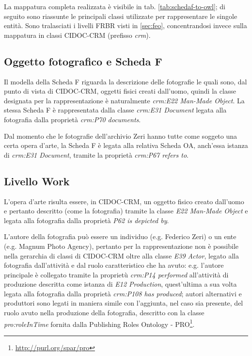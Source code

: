 La mappatura completa realizzata è visibile in tab. \ref{tab:schedaf-to-owl}; di seguito sono riassunte le principali classi utilizzate per rappresentare le singole entità. Sono tralasciati i livelli FRBR visti in \ref{sec:feo}, concentrandosi invece sulla mappatura in classi CIDOC-CRM (prefisso \emph{crm}).

\subsection{Oggetto fotografico e Scheda F}
Il modella della Scheda F riguarda la descrizione delle fotografie le quali sono, dal punto di vista di CIDOC-CRM, oggetti fisici creati dall'uomo, quindi la classe designata per la rappresentazione è naturalmente \emph{crm:E22 Man-Made Object}. La stessa Scheda F è rappresentata dalla classe \emph{crm:E31 Document} legata alla fotografia dalla proprietà \emph{crm:P70 documents}.

Dal momento che le fotografie dell'archivio Zeri hanno tutte come soggeto una certa opera d'arte, la Scheda F è legata alla relativa Scheda OA, anch'essa istanza di \emph{crm:E31 Document}, tramite la proprietà \emph{crm:P67 refers to}.

\subsection{Livello Work}

L'opera d'arte risulta essere, in CIDOC-CRM, un oggetto fisico creato dall'uomo e pertanto descritto (come la fotografia) tramite la classe \emph{E22 Man-Made Object} e legata alla fotografia dalla proprietà \emph{P62 is depicted by}.

L'autore della fotografia può essere un individuo (e.g. Federico Zeri) o un ente (e.g. Magnum Photo Agency), pertanto per la rappresentazione non è possibile nella gerarchia di classi di CIDOC-CRM oltre alla classe \emph{E39 Actor}, legato alla fotografia dall'attività e dal ruolo caratteristico che ha avuto: e.g. l'autore principale è collegato tramite la proprietù \emph{crm:P14 performed} all'attività di produzione descritta come istanza di \emph{E12 Production}, quest'ultima a sua volta legata alla fotografia dalla proprietà \emph{crm:P108 has produced}; autori alternativi e produttori sono legati in maniera simile con l'aggiunta, nel caso sia presente, del ruolo avuto nella produzione della fotografia, descritto con la classe \emph{pro:roleInTime} fornita dalla Publishing Roles Ontology - PRO\footnote{\url{http://purl.org/spar/pro}}.

